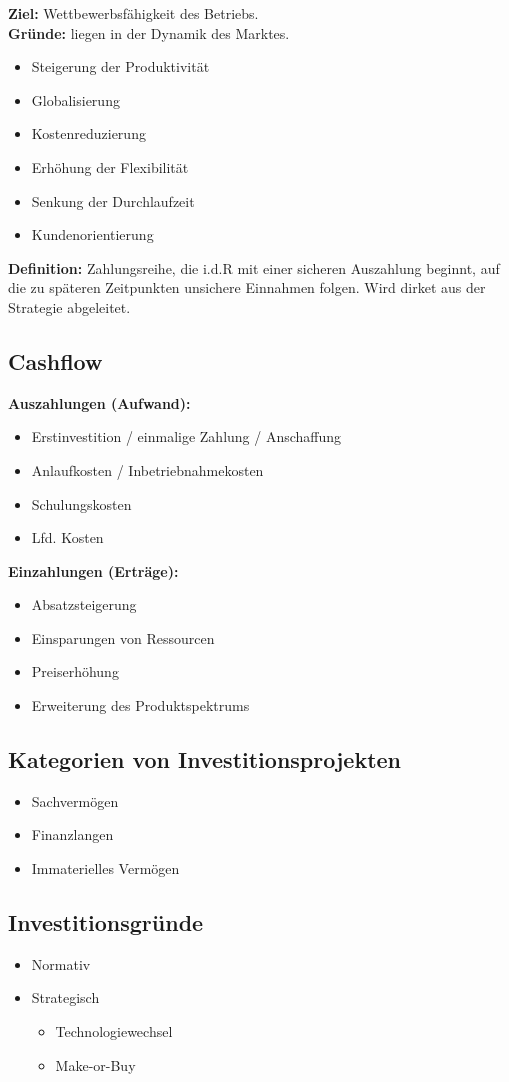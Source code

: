 \documentclass[../ZF_Wing.tex]{subfiles}
\begin{document}
\textbf{Ziel:} Wettbewerbsfähigkeit des Betriebs.\\
\textbf{Gründe:} liegen in der Dynamik des Marktes.\\
\begin{itemize}
	\item Steigerung der Produktivität
	\item Globalisierung
	\item Kostenreduzierung
	\item Erhöhung der Flexibilität
	\item Senkung der Durchlaufzeit
	\item Kundenorientierung
\end{itemize}
\textbf{Definition:} Zahlungsreihe, die i.d.R mit einer sicheren Auszahlung beginnt, 
auf die zu späteren Zeitpunkten unsichere Einnahmen folgen. Wird dirket aus der Strategie abgeleitet.

\subsection{Cashflow}
\textbf{Auszahlungen (Aufwand):}
\begin{itemize}
	\item Erstinvestition / einmalige Zahlung / Anschaffung
	\item Anlaufkosten / Inbetriebnahmekosten
	\item Schulungskosten
	\item Lfd. Kosten
\end{itemize}
\textbf{Einzahlungen (Erträge):}
\begin{itemize}
	\item Absatzsteigerung
	\item Einsparungen von Ressourcen
	\item Preiserhöhung
	\item Erweiterung des Produktspektrums
\end{itemize}


\subsection{Kategorien von Investitionsprojekten}
\begin{itemize}
	\item Sachvermögen
	\item Finanzlangen
	\item Immaterielles Vermögen
\end{itemize}

\subsection{Investitionsgründe}
\begin{itemize}
	\item Normativ
	\item Strategisch
	\begin{itemize}
		\item Technologiewechsel
		\item Make-or-Buy
	\end{itemize}
\end{itemize}
\end{document}
